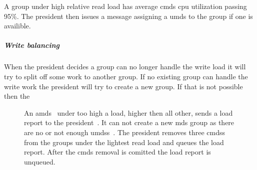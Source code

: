 A group under high relative read load has average \ac{cmds} cpu utilization passing 95\%. The president then issues a \raft{} message assigning a \ac{umds} to the group if one is availible. %
%
\subparagraph*{Write balancing}
When the president decides a group can no longer handle the write load it will try to split off some work to another group. If no existing group can handle the write work the president will try to create a new group. If that is not possible then the 




\begin{figure}[htbp]
	\centering
	
	\caption{An \ac{amds}~\amdsLeg{} under too high a load, higher then all other, sends a load report to the president~\presidentLeg{}. It can not create a new \ac{mds} group as there are no or not enough \acp{umds}~\umdsLeg{}. The president removes three \acp{cmds}~\cmdsLeg{} from the groups under the lightest read load and queues the load report. After the \ac{cmds} removal is comitted the load report is unqueued. }
	\label{fig:subtree}
\end{figure}
